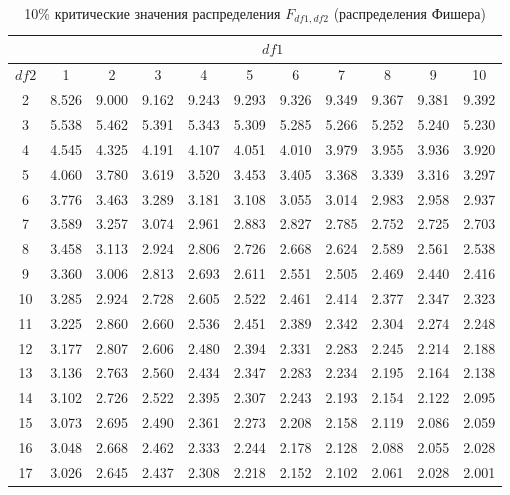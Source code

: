 \documentclass[12pt]{article}
\begin{document}
\begin{table}
\caption{10\% критические значения распределения $F_{df1,df2}$
(распределения Фишера) }
\begin{center}
{\footnotesize
\begin{tabular}{|c|c|c|c|c|c|c|c|c|c|c|}
  \hline
& \multicolumn{10}{c|}{$df1$} \\ \hline
 $df2$ &   1&   2&   3&   4&   5&   6&   7&   8&   9&   10\\ \hline \hline
 2 &  8.526 &  9.000 &  9.162 &  9.243 &  9.293&9.326& 9.349 &9.367 &  9.381 &  9.392\\
 3 &  5.538 &  5.462 &  5.391&5.343& 5.309& 5.285& 5.266 &  5.252 &  5.240 &  5.230\\
4 &  4.545&4.325& 4.191 &4.107 &4.051 &4.010 &  3.979 &  3.955 &  3.936&3.920\\
5 &4.060 &3.780 &3.619 &3.520 &3.453 &  3.405 &  3.368 &  3.339&3.316 &3.297 \\
6 &3.776 &3.463 &3.289& 3.181 &  3.108 &  3.055 &3.014 &2.983 &2.958&2.937 \\
7 &3.589 &3.257 &3.074& 2.961 &2.883& 2.827 &2.785 &2.752 &2.725&2.703 \\
8 &3.458 &3.113 &2.924 &2.806 &  2.726 &2.668 &2.624 &  2.589 &2.561&2.538\\
 9 &3.360 &3.006 &2.813&   2.693 &2.611 &2.551 &  2.505 &2.469 &2.440&2.416\\
 10 &3.285 &2.924 &2.728 &2.605 &2.522 &  2.461 &2.414 &2.377 &2.347&2.323\\
 11 &3.225 &2.860 &2.660 &2.536 &2.451 &  2.389 &2.342 &2.304 &2.274&2.248\\
 12& 3.177& 2.807 &2.606 &  2.480 &2.394& 2.331 &  2.283 &2.245 &2.214&2.188\\
 13& 3.136& 2.763 &2.560 &  2.434 &2.347 &  2.283& 2.234 &2.195 &2.164&2.138 \\
14 &3.102& 2.726& 2.522 &2.395 &  2.307& 2.243 &2.193 &2.154& 2.122&2.095 \\
15& 3.073& 2.695& 2.490 &  2.361& 2.273& 2.208&   2.158& 2.119&2.086& 2.059 \\
16& 3.048 &2.668 &2.462 &2.333 &2.244& 2.178 &2.128 &2.088 &2.055&2.028\\
 17& 3.026& 2.645 &2.437 &2.308 &  2.218& 2.152& 2.102&   2.061& 2.028&2.001\\

\end{tabular}}
\end{center}
\end{table}
\end{document}
